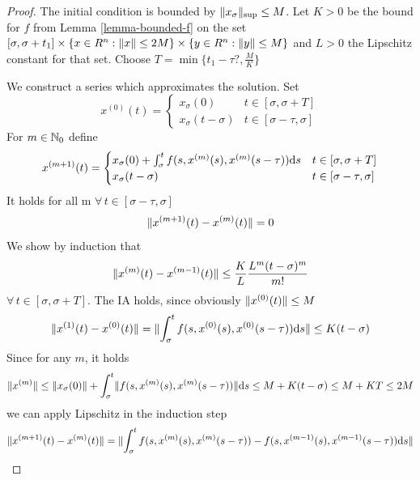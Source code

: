 \documentclass[10pt]{article}
\begin{document}
\begin{proof}
    The initial condition is bounded by $\lVert x_\sigma\rVert_{\text{\scriptsize{sup}}}\leq M$.
    Let $K>0$ be the bound for $f$ from Lemma \ref{lemma-bounded-f} on the set $[\sigma,\sigma+t_1] \times \{x\in R^n: \lVert x\rVert\leq 2M\}\times \{y\in R^n: \lVert y\rVert\leq M\}$ and $L>0$ the Lipschitz constant for that set. Choose $T=\min\{t_1-\tau ?, \frac{M}{K}\}$

    We construct a series which approximates the solution.
    Set
    \begin{equation}
        x^{(0)}(t)= \begin{cases}
            x_\sigma(0) & t\in [\sigma,\sigma+T]\\
            x_\sigma(t-\sigma) & t\in [\sigma-\tau,\sigma]
        \end{cases}
    \end{equation}
    For $m\in\mathbb{N}_0$ define
    \begin{equation}
        x^{(m+1)}(t)= \begin{cases}
            x_\sigma(0) + \int_\sigma^t f(s,x^{(m)}(s),x^{(m)}(s-\tau))\text{d}s & t\in [\sigma,\sigma+T]\\
            x_\sigma(t-\sigma) & t\in [\sigma-\tau,\sigma]
        \end{cases}
    \end{equation}
    It holds for all m $\forall\,t\in [\sigma-\tau,\sigma]$
    \begin{equation}
        \lVert x^{(m+1)}(t)-x^{(m)}(t)\rVert=0
    \end{equation}
    We show by induction that
    \begin{equation}
        \lVert x^{(m)}(t)-x^{(m-1)}(t)\rVert \leq \frac{K}{L}\frac{L^m (t-\sigma)^m}{m!}
    \end{equation}
    $\forall\,t\in [\sigma,\sigma+T]$.
    The IA holds, since obviously $\lVert x^{(0)}(t)\rVert\leq M$
    \begin{equation}
        \lVert x^{(1)}(t)-x^{(0)}(t)\rVert = \lVert\int_\sigma^t f(s,x^{(0)}(s),x^{(0)}(s-\tau))\text{d}s\rVert \leq K(t-\sigma)
    \end{equation}
    Since for any $m$, it holds
    \begin{equation}
        \lVert x^{(m)}\rVert\leq \lVert x_\sigma(0)\rVert + \int_\sigma^t \lVert f(s,x^{(m)}(s),x^{(m)}(s-\tau))\rVert\text{d}s
        \leq M + K(t-\sigma) \leq M+KT \leq 2M
    \end{equation}
    we can apply Lipschitz in the induction step
    \begin{align}
        \norm{x^{(m+1)}(t)-x^{(m)}(t)} &= \norm{\int_\sigma^t f(s,x^{(m)}(s),x^{(m)}(s-\tau)) - f(s,x^{(m-1)}(s),x^{(m-1)}(s-\tau))\dx{s}}\\

\end{align}
\end{proof}
\end{document}
